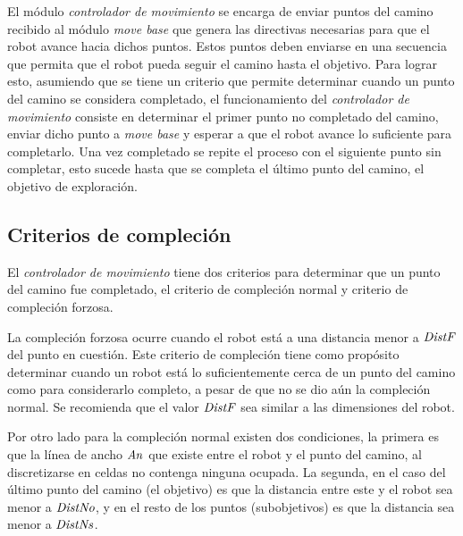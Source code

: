 

El módulo \emph{controlador de movimiento} se encarga de enviar puntos del
camino recibido al módulo \emph{move base} que genera las directivas necesarias
para que el robot avance hacia dichos puntos. Estos puntos deben enviarse en
una secuencia que permita que el robot pueda seguir el camino hasta el
objetivo. Para lograr esto, asumiendo que se tiene un criterio que permite
determinar cuando un punto del camino se considera completado, el
funcionamiento del \emph{controlador de movimiento} consiste en determinar el
primer punto no completado del camino, enviar dicho punto a \emph{move base} y
esperar a que el robot avance lo suficiente para completarlo. Una vez
completado se repite el proceso con el siguiente punto sin completar, esto
sucede hasta que se completa el último punto del camino, el objetivo de
exploración.


\subsection{Criterios de compleción}

El \emph{controlador de movimiento} tiene dos criterios para determinar que un
punto del camino fue completado, el criterio de compleción normal y criterio de
compleción forzosa.

La compleción forzosa ocurre cuando el robot está a una distancia menor a
$\mathit{DistF}$ del punto en cuestión. Este criterio de compleción tiene como
propósito determinar cuando un robot está lo suficientemente cerca de un punto
del camino como para considerarlo completo, a pesar de que no se dio aún la
compleción normal. Se recomienda que el valor $\mathit{DistF}$ sea similar a las
dimensiones del robot.

Por otro lado para la compleción normal existen dos condiciones, la primera es
que la línea de ancho $\mathit{An}$ que existe entre el robot y el punto del camino,
al discretizarse en celdas no contenga ninguna ocupada. La segunda, en el
caso del último punto del camino (el objetivo) es que la distancia entre este y
el robot sea menor a $\mathit{DistNo}$, y en el resto de los puntos (subobjetivos)
es que la distancia sea menor a $\mathit{DistNs}$.

